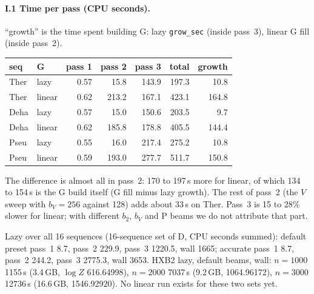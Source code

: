 \documentclass[11pt]{article}
\begin{document}
\paragraph{I.1 Time per pass (CPU seconds).} ``growth'' is the time spent building G: lazy \texttt{grow\_sec} (inside pass~3), linear G fill (inside pass~2).
\begin{center}
\small
\begin{tabular}{@{}llrrrrr@{}}
\toprule
seq & G & pass 1 & pass 2 & pass 3 & total & growth \\
\midrule
Ther & lazy & 0.57 & 15.8 & 143.9 & 197.3 & 10.8 \\
Ther & linear & 0.62 & 213.2 & 167.1 & 423.1 & 164.8 \\
Deha & lazy & 0.57 & 15.0 & 150.6 & 203.5 & 9.7 \\
Deha & linear & 0.62 & 185.8 & 178.8 & 405.5 & 144.4 \\
Pseu & lazy & 0.55 & 16.0 & 217.4 & 275.2 & 10.8 \\
Pseu & linear & 0.59 & 193.0 & 277.7 & 511.7 & 150.8 \\
\bottomrule
\end{tabular}
\end{center}
The difference is almost all in pass~2: 170 to 197\,s more for linear, of which 134 to 154\,s is the G build itself (G fill minus lazy growth). The rest of pass~2 (the $V$ sweep with $b_V=256$ against 128) adds about 33\,s on Ther. Pass~3 is 15 to 28\% slower for linear; with different $b_2$, $b_V$ and P beams we do not attribute that part.

Lazy over all 16 sequences (16-sequence set of D, CPU seconds summed): default preset pass~1 8.7, pass~2 229.9, pass~3 1220.5, wall 1665; accurate pass~1 8.7, pass~2 244.2, pass~3 2775.3, wall 3653. HXB2 lazy, default beams, wall: $n=1000$ 1155\,s (3.4\,GB, $\log Z$ 616.64998), $n=2000$ 7037\,s (9.2\,GB, 1064.96172), $n=3000$ 12736\,s (16.6\,GB, 1546.92920). No linear run exists for these two sets yet.
\end{document}
